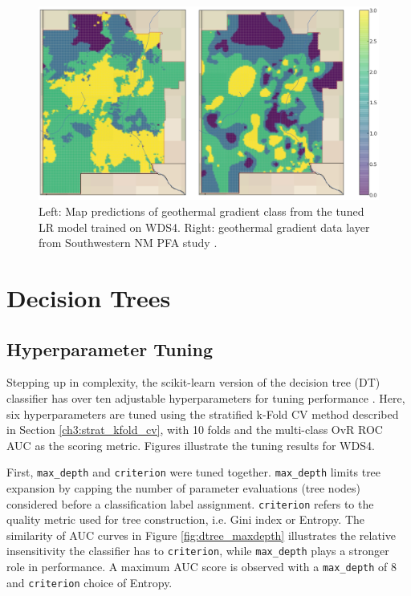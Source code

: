 \begin{figure}[!htp]
\centering
\includegraphics[width=\textwidth]{templates/images/Figure-LR-FinalMap_Joint.png}
\caption[Logistic regression prediction map]{Left: Map predictions of geothermal gradient class from the tuned LR model trained on WDS4. Right: geothermal gradient data layer from Southwestern NM PFA study \protect\citep{bielicki_hydrogeolgic_2015}.}
\label{fig:logreg_final_map}
\end{figure}

\section{Decision Trees}\label{ch5:dtree_model}
\subsection{Hyperparameter Tuning}\label{ch5:dtree_tuning}
Stepping up in complexity, the scikit-learn version of the decision tree (DT) classifier has over ten adjustable hyperparameters for tuning performance \citep{pedregosa_scikit-learn_2011}. Here, six hyperparameters are tuned using the stratified k-Fold CV method described in Section \ref{ch3:strat_kfold_cv}, with 10 folds and the multi-class OvR ROC AUC as the scoring metric. Figures illustrate the tuning results for WDS4.

First, \verb|max_depth| and \verb|criterion| were tuned together. \verb|max_depth| limits tree expansion by capping the number of parameter evaluations (tree nodes) considered before a classification label assignment. \verb|criterion| refers to the quality metric used for tree construction, i.e. Gini index or Entropy. The similarity of AUC curves in Figure \ref{fig:dtree_maxdepth} illustrates the relative insensitivity the classifier has to \verb|criterion|, while \verb|max_depth| plays a stronger role in performance. A maximum AUC score is observed with a \verb|max_depth| of 8 and \verb|criterion| choice of Entropy.

